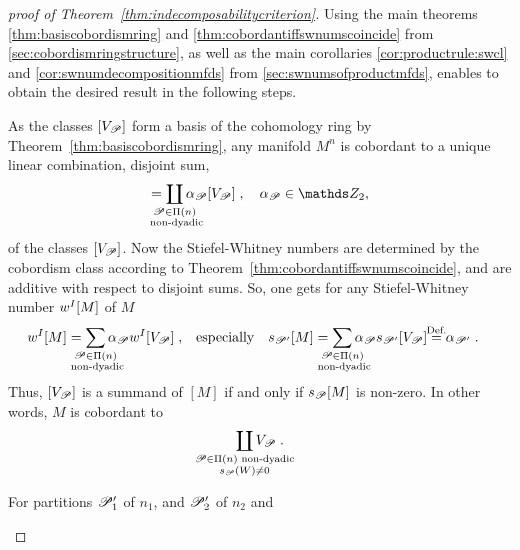\begin{proof}[proof of Theorem~\ref{thm:indecomposabilitycriterion}]
  Using the main theorems \ref{thm:basiscobordismring} and
  \ref{thm:cobordantiffswnumscoincide} from
  \autoref{sec:cobordismringstructure}, as well as the main
  corollaries \ref{cor:productrule:swcl} and
  \ref{cor:swnumdecompositionmfds} from
  \autoref{sec:swnumsofproductmfds}, enables to obtain the
  desired result in the following steps.
  \begin{steps}
  \item\label{item:manifoldbasisrepr}
    As the classes $[V_{\mathscr{P}}]$ form a basis of the cohomology ring by
    Theorem~\ref{thm:basiscobordismring}, any manifold $M^n$ is
    cobordant to a unique linear combination, \idest disjoint sum,
    \begin{gather*}
      [M] = \coprod_{\mathclap{\substack{
            \Part\in\PartitionsOf n \\\text{ non-dyadic}
          }}} \alpha_\Part [V_\Part]
      \;,\quad
      \alpha_\Part \in \Zmod2,
    \end{gather*}
    of the classes $[V_{\mathscr{P}}]$.
    Now the Stiefel-Whitney numbers are determined by the cobordism
    class according to Theorem~\ref{thm:cobordantiffswnumscoincide},
    and are additive with respect to disjoint sums.
    So, one gets for any Stiefel-Whitney number $w^{I}[M]$ of $M$
    \begin{align*}
      \wsnum{I}{M}
      &= \sum_{\mathclap{\substack{
        \Part\in\PartitionsOf n \\\text{ non-dyadic}
      }}} \alpha_\Part \wsnum{I}{V_\Part}
      \;,
      &\text{especially}
      &&\snum{\Part'}{M}
      &= \sum_{\mathclap{\substack{
        \Part\in\PartitionsOf n \\\text{ non-dyadic}
      }}} \alpha_\Part \snum{\Part'}{V_\Part}
      \cequalsby{Def.} \alpha_{\Part'}
      \;.
    \end{align*}
    Thus, $[V_{\mathscr{P}}]$ is a summand of $[M]$ if and only if
    $s_{\mathscr{P}}[M]$ is non-zero. In other words, $M$ is cobordant to
    \begin{gather*}
      \coprod_{\mathclap{\substack{
            \Part\in\PartitionsOf n \text{ non-dyadic}\\
            \s{\Part}(W)\neq 0
          }}} V_\Part
      \;.
    \end{gather*}
  \item\label{item:productpartitions}
    For partitions $\mathscr{P}_1'$ of $n_1$, and $\mathscr{P}_2'$ of $n_2$ and

\end{steps}
\end{proof}
